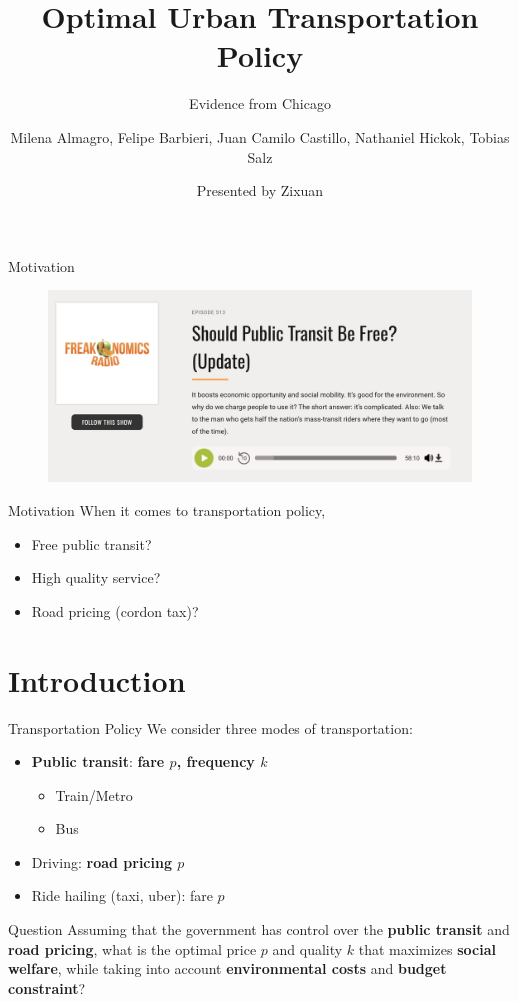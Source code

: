 \documentclass[10pt, aspectratio=169]{beamer}
\title{Optimal Urban Transportation Policy}
\subtitle{Evidence from Chicago}
\date{Presented by Zixuan}
\author{Milena Almagro, Felipe Barbieri, Juan Camilo Castillo, Nathaniel Hickok, Tobias Salz}
\institute{\today}
\begin{document}
\maketitle

\begin{frame}{Motivation}
  \begin{figure}
    \centering
    \includegraphics[width=\textwidth]{../Figures/freakonomics_2.png}
  \end{figure}
\end{frame}

\begin{frame}{Motivation}
  When it comes to transportation policy,
  \begin{itemize}
    \item Free public transit?
    \item High quality service?
    \item Road pricing (cordon tax)?
  \end{itemize}
\end{frame}

\section{Introduction}
\begin{frame}{Transportation Policy}
  We consider three modes of transportation:
  \begin{itemize}
    \item \textbf{Public transit}: \textbf{fare $p$, frequency $k$}
          \begin{itemize}
            \item Train/Metro
            \item Bus
          \end{itemize}
    \item Driving: \textbf{road pricing $p$}
    \item Ride hailing (taxi, uber): fare $p$
  \end{itemize}
  \begin{block}{Question}
    Assuming that the government has control over the \textbf{public transit} and \textbf{road pricing}, what is the optimal price $p$ and quality $k$ that maximizes \textbf{social welfare}, while taking into account \textbf{environmental costs} and \textbf{budget constraint}?
  \end{block}
\end{frame}
\end{document}
